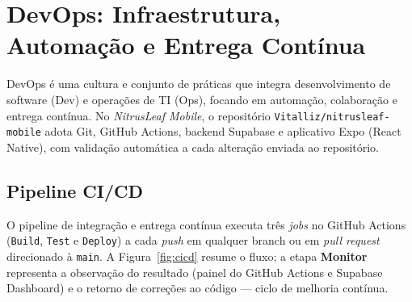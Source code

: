 
\section{DevOps: Infraestrutura, Automação e Entrega Contínua}

DevOps \cite{wang2023} é uma cultura e conjunto de práticas que integra desenvolvimento de software (Dev) e operações de TI (Ops), focando em automação, colaboração e entrega contínua. No \textit{NitrusLeaf Mobile}, o repositório \texttt{Vitalliz/nitrusleaf-mobile} adota Git, GitHub Actions, backend Supabase e aplicativo Expo (React Native), com validação automática a cada alteração enviada ao repositório.

\subsection{Pipeline CI/CD}

O pipeline de integração e entrega contínua executa três \textit{jobs} no GitHub Actions (\texttt{Build}, \texttt{Test} e \texttt{Deploy}) a cada \textit{push} em qualquer branch ou em \textit{pull request} direcionado à \texttt{main}. A Figura~\ref{fig:cicd} resume o fluxo; a etapa \textbf{Monitor} representa a observação do resultado (painel do GitHub Actions e Supabase Dashboard) e o retorno de correções ao código --- ciclo de melhoria contínua.


